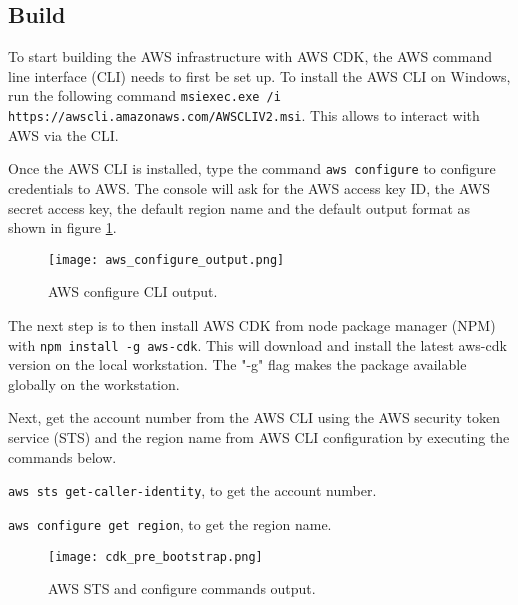 


\subsection*{Build}
\label{subsec:build}

To start building the AWS infrastructure with AWS CDK, the AWS command line interface (CLI) needs to first be set up. To install the AWS CLI on Windows, run the following command \texttt{msiexec.exe /i https://awscli.amazonaws.com/AWSCLIV2.msi}. This allows to interact with AWS via the CLI.

Once the AWS CLI is installed, type the command \texttt{aws configure} to configure credentials to AWS. The console will ask for the AWS access key ID, the AWS secret access key, the default region name and the default output format as shown in figure \ref{fig:aws-configure-output}.

\begin{figure}[H]
    \centering \texttt{[image: aws\_configure\_output.png]}
    \caption{AWS configure CLI output.}
    \label{fig:aws-configure-output}
\end{figure}

The next step is to then install AWS CDK from node package manager (NPM) with \texttt{npm install -g aws-cdk}. This will download and install the latest aws-cdk version on the local workstation. The "-g" flag makes the package available globally on the workstation.

Next, get the account number from the AWS CLI using the AWS security token service (STS) and the region name from AWS CLI configuration by executing the commands below.

\texttt{aws sts get-caller-identity}, to get the account number.

\texttt{aws configure get region}, to get the region name.

\begin{figure}[H]
    \centering \texttt{[image: cdk\_pre\_bootstrap.png]}
    \caption{AWS STS and configure commands output.}
    \label{fig:aws-account-numbre-region}
\end{figure}

